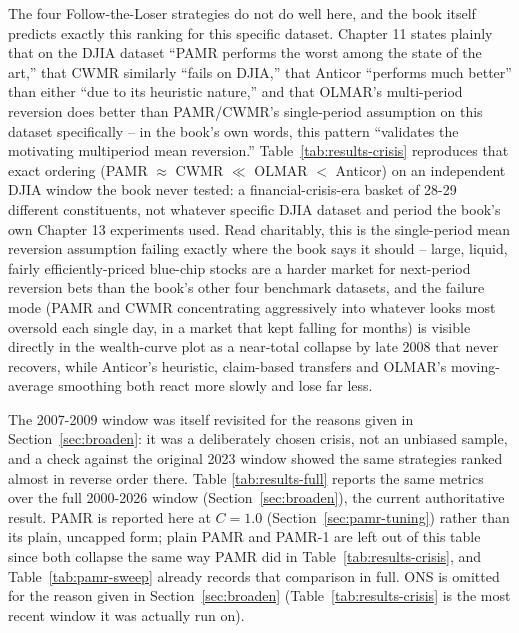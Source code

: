 \documentclass[11pt]{article}
\begin{document}
The four Follow-the-Loser strategies do not do well here, and the book
itself predicts exactly this ranking for this specific dataset. Chapter
11 states plainly that on the DJIA dataset ``PAMR performs the worst
among the state of the art,'' that CWMR similarly ``fails on DJIA,''
that Anticor ``performs much better'' than either ``due to its
heuristic nature,'' and that OLMAR's multi-period reversion does better
than PAMR/CWMR's single-period assumption on this dataset specifically
-- in the book's own words, this pattern ``validates the motivating
multiperiod mean reversion.'' Table~\ref{tab:results-crisis} reproduces
that exact ordering (PAMR $\approx$ CWMR $\ll$ OLMAR $<$ Anticor) on an
independent DJIA window the book never tested: a financial-crisis-era
basket of 28-29 different constituents, not whatever specific DJIA
dataset and period the book's own Chapter 13 experiments used. Read
charitably, this is the single-period mean reversion assumption failing
exactly where the book says it should -- large, liquid, fairly
efficiently-priced blue-chip stocks are a harder market for
next-period reversion bets than the book's other four benchmark
datasets, and the failure mode (PAMR and CWMR concentrating aggressively
into whatever looks most oversold each single day, in a market that
kept falling for months) is visible directly in the wealth-curve plot
as a near-total collapse by late 2008 that never recovers, while
Anticor's heuristic, claim-based transfers and OLMAR's moving-average
smoothing both react more slowly and lose far less.

The 2007-2009 window was itself revisited for the reasons given in
Section~\ref{sec:broaden}: it was a deliberately chosen crisis, not an
unbiased sample, and a check against the original 2023 window showed
the same strategies ranked almost in reverse order there. Table
\ref{tab:results-full} reports the same metrics over the full
2000-2026 window (Section~\ref{sec:broaden}), the current authoritative
result. PAMR is reported here at $C=1.0$ (Section~\ref{sec:pamr-tuning})
rather than its plain, uncapped form; plain PAMR and PAMR-1 are left out
of this table since both collapse the same way PAMR did in
Table~\ref{tab:results-crisis}, and Table~\ref{tab:pamr-sweep} already
records that comparison in full. ONS is omitted for the reason given in
Section~\ref{sec:broaden} (Table~\ref{tab:results-crisis} is the most
recent window it was actually run on).
\end{document}
